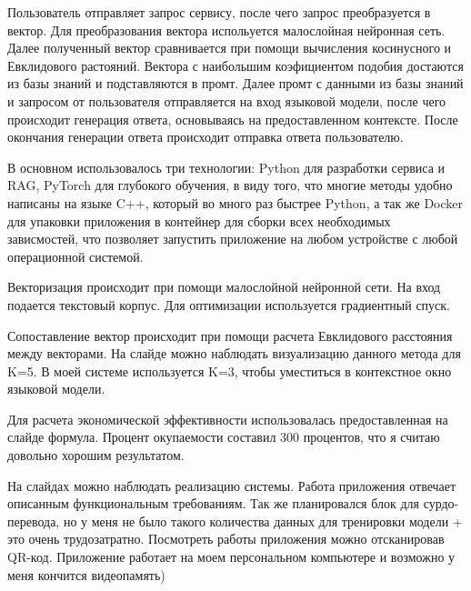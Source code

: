 Пользователь отправляет запрос сервису, после чего запрос преобразуется в
вектор. Для преобразования вектора испольуется малослойная нейронная сеть.
Далее полученный вектор сравнивается при помощи вычисления косинусного и 
Евклидового растояний. Вектора с наибольшим коэфициентом подобия достаются
из базы знаний и подставляются в промт. Далее промт с данными из базы знаний
и запросом от пользователя отправляется на вход языковой модели, после чего
происходит генерация ответа, основываясь на предоставленном контексте.
После окончания генерации ответа происходит отправка ответа пользователю.


В основном использовалось три технологии: Python для разработки сервиса и RAG,
PyTorch для глубокого обучения, в виду того, что многие методы удобно 
написаны на языке C++, который во много раз быстрее Python, а так же Docker
для упаковки приложения в контейнер для сборки всех необходимых зависмостей,
что позволяет запустить приложение на любом устройстве с любой операционной
системой.


Векторизация происходит при помощи малослойной нейронной сети. На вход подается
текстовый корпус. Для оптимизации используется градиентный спуск.


Сопоставление вектор происходит при помощи расчета Евклидового расстояния между
векторами. На слайде можно наблюдать визуализацию данного метода для K=5. 
В моей системе используется K=3, чтобы уместиться в контекстное окно 
языковой модели.


Для расчета экономической эффективности использовалась предоставленная на
слайде формула. Процент окупаемости составил 300 процентов, что я считаю
довольно хорошим результатом.


На слайдах можно наблюдать реализацию системы. Работа приложения отвечает
описанным функциональным требованиям.
Так же планировался блок для сурдо-перевода, но у меня не было такого
количества данных для тренировки модели + это очень трудозатратно.
Посмотреть работы приложения можно отсканировав QR-код. Приложение работает
на моем персональном компьютере и возможно у меня кончится видеопамять)


